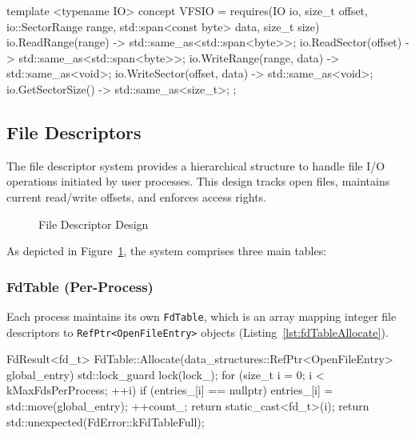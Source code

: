 \documentclass[a4paper,10pt,twoside]{report}
\theoremstyle{definition}
\begin{document}
\clearpage

\begin{cppcode}[caption={VFSIO Concept Definition}, label={lst:vfsioConcept}]
template <typename IO>
concept VFSIO =
    requires(IO io, size_t offset, io::SectorRange range, std::span<const byte> data, size_t size) {
        { io.ReadRange(range) } -> std::same_as<std::span<byte>>;
        { io.ReadSector(offset) } -> std::same_as<std::span<byte>>;
        { io.WriteRange(range, data) } -> std::same_as<void>;
        { io.WriteSector(offset, data) } -> std::same_as<void>;
        { io.GetSectorSize() } -> std::same_as<size_t>;
    };
\end{cppcode}

\subsection{File Descriptors}

The file descriptor system provides a hierarchical structure to handle file I/O operations initiated by user processes. This design tracks open files, maintains current read/write offsets, and enforces access rights.

\begin{figure}[htbp]
  \centering
  
  \caption{File Descriptor Design}
  \label{fig:fd_architecture}
\end{figure}

As depicted in Figure~\ref{fig:fd_architecture}, the system comprises three main tables:

\subsubsection{FdTable (Per-Process)}
Each process maintains its own \texttt{FdTable}, which is an array mapping integer file descriptors to \texttt{RefPtr<OpenFileEntry>} objects (Listing~\ref{lst:fdTableAllocate}).

\begin{cppcode}[caption={FdTable Allocation}, label={lst:fdTableAllocate}]
FdResult<fd_t> FdTable::Allocate(data_structures::RefPtr<OpenFileEntry> global_entry)
{
    std::lock_guard lock(lock_);
    for (size_t i = 0; i < kMaxFdsPerProcess; ++i) {
        if (entries_[i] == nullptr) {
            entries_[i] = std::move(global_entry);
            ++count_;
            return static_cast<fd_t>(i);
        }
    }
    return std::unexpected(FdError::kFdTableFull);
}
\end{cppcode}
\end{document}
